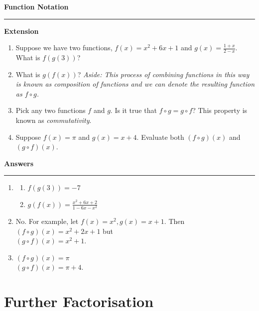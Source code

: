 \documentclass[]{article}
\begin{document}
\newpage

\noindent \textbf{Function Notation}

\medskip

\hrule

\medskip

\noindent \textbf{Extension}

\begin{enumerate}
    \item Suppose we have two functions, \(f(x)=x^2+6x+1\) and \(g(x)=\frac{1+x}{2-x}\). What is \(f(g(3))\)?
    \item What is \(g(f(x))\)?
    \medskip
    \newline
    \textit{Aside: This process of combining functions in this way is known as composition of functions and we can denote the resulting function as \(f \circ g\). }
    \item  Pick any two functions \(f\) and \(g\). Is it true that \(f\circ g=g\circ f\)? This property is known as \textit{commutativity}.
    \item Suppose \(f(x)=\pi\) and \(g(x)=x+4\). Evaluate both \((f \circ g)(x)\) and \((g \circ f)(x)\).
\end{enumerate}

\newpage

\noindent \textbf{Answers}

\medskip

\hrule

\medskip

\begin{enumerate}
    \item \begin{enumerate}
        \item \(f(g(3))=-7\)
        \item \(g(f(x)) = \frac{x^2+6x+2}{1-6x-x^2}\)
    \end{enumerate}
    \item No. For example, let \(f(x)=x^2, g(x)=x+1\). Then \\
    \((f\circ g)(x) = x^2+2x+1\) but \\
    \((g\circ f)(x) = x^2 +1\).
    \item \((f\circ g)(x) = \pi\) \\
    \((g\circ f)(x) = \pi +4.\)
\end{enumerate}

\newpage

\section{Further Factorisation}
\end{document}
